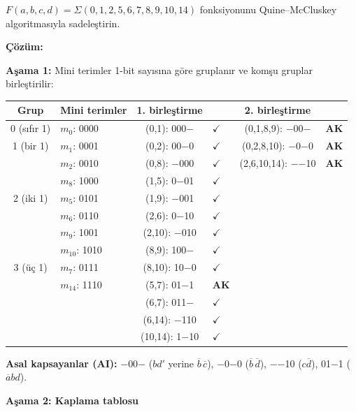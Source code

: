 \begin{ornek}[B.8]
$F(a,b,c,d) = \Sigma(0, 1, 2, 5, 6, 7, 8, 9, 10, 14)$ fonksiyonunu Quine--McCluskey algoritmasıyla sadeleştirin.

\textbf{Çözüm:}

\textbf{Aşama 1:} Mini terimler 1-bit sayısına göre gruplanır ve komşu gruplar birleştirilir:

\begin{center}
\small
\begin{tabular}{cl|cl|cl}
\toprule
\textbf{Grup} & \textbf{Mini terimler} & \textbf{1. birleştirme} & & \textbf{2. birleştirme} & \\
\midrule
0 (sıfır 1) & $m_0$: 0000 & (0,1): 000$-$ & $\checkmark$ & (0,1,8,9): $-$00$-$ & \textbf{AK} \\
1 (bir 1)   & $m_1$: 0001 & (0,2): 00$-$0 & $\checkmark$ & (0,2,8,10): $-$0$-$0 & \textbf{AK} \\
             & $m_2$: 0010 & (0,8): $-$000 & $\checkmark$ & (2,6,10,14): $-$$-$10 & \textbf{AK} \\
             & $m_8$: 1000 & (1,5): 0$-$01 & $\checkmark$ & & \\
2 (iki 1)   & $m_5$: 0101 & (1,9): $-$001 & $\checkmark$ & & \\
             & $m_6$: 0110 & (2,6): 0$-$10 & $\checkmark$ & & \\
             & $m_9$: 1001 & (2,10): $-$010 & $\checkmark$ & & \\
             & $m_{10}$: 1010 & (8,9): 100$-$ & $\checkmark$ & & \\
3 (üç 1)    & $m_7$: 0111 & (8,10): 10$-$0 & $\checkmark$ & & \\
             & $m_{14}$: 1110 & (5,7): 01$-$1 & \textbf{AK} & & \\
             &              & (6,7): 011$-$ & $\checkmark$ & & \\
             &              & (6,14): $-$110 & $\checkmark$ & & \\
             &              & (10,14): 1$-$10 & $\checkmark$ & & \\
\bottomrule
\end{tabular}
\end{center}

\textbf{Asal kapsayanlar (AI):} $-$00$-$ ($bd'$ yerine $\overline{b}\,\overline{c}$), $-$0$-$0 ($\overline{b}\,\overline{d}$), $-$$-$10 ($c\overline{d}$), 01$-$1 ($\overline{a}bd$).

\textbf{Aşama 2: Kaplama tablosu}


\end{ornek}
